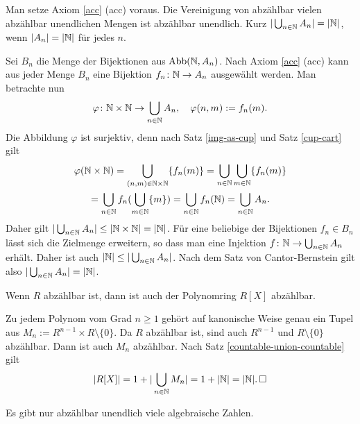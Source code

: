 \newpage
\begin{Satz}\label{countable-union-countable}
Man setze Axiom \ref{acc} (acc) voraus.
Die Vereinigung von abzählbar vielen abzählbar unendlichen Mengen
ist abzählbar unendlich. Kurz $|\bigcup_{n\in\mathbb N} A_n| = |\mathbb N|$, wenn
$|A_n|=|\mathbb N|$ für jedes $n$.
\end{Satz}

\begin{Beweis}
Sei $B_n$ die Menge der Bijektionen aus $\operatorname{Abb}(\mathbb N,A_n)$. 
Nach Axiom \ref{acc} (acc) kann aus jeder Menge $B_n$
eine Bijektion $f_n\colon\mathbb N\to A_n$ ausgewählt werden.
Man betrachte nun
\[\varphi\colon\mathbb N\times\mathbb N\to\bigcup_{n\in\mathbb N} A_n,\quad
\varphi(n,m):=f_n(m).\]
Die Abbildung $\varphi$ ist surjektiv, denn nach
Satz \ref{img-as-cup} und Satz \ref{cup-cart} gilt
\begin{gather*}
\varphi(\mathbb N\times\mathbb N) = \bigcup_{(n,m)\in\mathbb N{\times}\mathbb N} \{f_n(m)\}
= \bigcup_{n\in\mathbb N}\bigcup_{m\in\mathbb N} \{f_n(m)\}\\
= \bigcup_{n\in\mathbb N} f_n(\bigcup_{m\in\mathbb N} \{m\})
= \bigcup_{n\in\mathbb N} f_n(\mathbb N) = \bigcup_{n\in\mathbb N} A_n.
\end{gather*}
Daher gilt $|\bigcup_{n\in\mathbb N} A_n|\le |\mathbb N\times \mathbb N| = |\mathbb N|$.
Für eine beliebige der Bijektionen $f_n\in B_n$ lässt sich die Zielmenge
erweitern, so dass man eine Injektion $f\colon\mathbb N\to\bigcup_{n\in\mathbb N} A_n$
erhält. Daher ist auch $|\mathbb N|\le |\bigcup_{n\in\mathbb N} A_n|$. Nach dem
Satz von Cantor-Bernstein gilt also
$|\bigcup_{n\in\mathbb N} A_n|=|\mathbb N|$.\,\qedsymbol
\end{Beweis}

\begin{Satz}\label{countable-polynomial-ring}
Wenn $R$ abzählbar ist, dann ist auch der Polynomring $R[X]$ abzählbar.
\end{Satz}

\begin{Beweis}
Zu jedem Polynom vom Grad $n\ge 1$ gehört auf kanonische Weise
genau ein Tupel aus $M_n:=R^{n-1}\times R\setminus\{0\}$. Da $R$
abzählbar ist, sind auch $R^{n-1}$ und $R\setminus\{0\}$ abzählbar.
Dann ist auch $M_n$ abzählbar. Nach Satz \ref{countable-union-countable}
gilt
\[|R[X]| = 1+|\bigcup_{n\in\mathbb N} M_n| = 1+|\mathbb N| = |\mathbb N|.\,\square\]
\end{Beweis}

\begin{Satz}
Es gibt nur abzählbar unendlich viele algebraische Zahlen.
\end{Satz}


